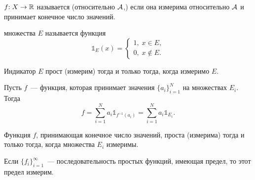 \documentclass{notes}
\begin{document}
	\begin{de}
		$f \text{\text{:}} \; X \to \mathbb{R}$ называется  (относительно $\mathcal{A}$,) если она измерима относительно $\mathcal{A}$ и принимает конечное число значений.
	\end{de}

	\begin{de}
		 множества $E$ называется функция 
		\[
			\mathbb{1}_E(x) = \begin{cases}
				1, \; x \in E, \\
				0, \; x \notin E.
			\end{cases}
		\]
	\end{de}

	\begin{st}
		Индикатор $E$ прост (измерим) тогда и только тогда, когда измеримо $E$.
	\end{st}

	\begin{st}
		Пусть $f$~--- функция, которая принимает значения $\{a_i\}_{i = 1}^{N}$ на множествах $E_i$. Тогда
		\[
			f = \sum\limits_{i = 1}^N a_i \mathbb{1}_{f^{-1}(a_i)} = \sum\limits_{i = 1}^N a_i \mathbb{1}_{E_i}.
		\]
	\end{st}

	\begin{st}
		Функция $f$, принимающая конечное число значений, проста (измерима) тогда и только тогда, когда множества $E_i$ измеримы.
	\end{st}

	\begin{thm}
		Если $\{f_i\}_{i = 1}^{\infty}$~--- последовательность простых функций, имеющая предел, то этот предел измерим.
	\end{thm}
\end{document}
